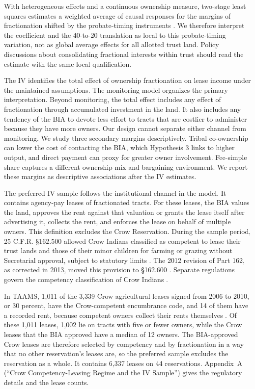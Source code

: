 \documentclass[12pt]{article}
\begin{document}
With heterogeneous effects and a continuous ownership measure, two-stage least squares estimates a weighted average of causal responses for the margins of fractionation shifted by the probate-timing instruments \citep{MogstadTorgovitsky2018}. We therefore interpret the coefficient and the 40-to-20 translation as local to this probate-timing variation, not as global average effects for all allotted trust land. Policy discussions about consolidating fractional interests within trust should read the estimate with the same local qualification.

The IV identifies the total effect of ownership fractionation on lease income under the maintained assumptions. The monitoring model organizes the primary interpretation. Beyond monitoring, the total effect includes any effect of fractionation through accumulated investment in the land. It also includes any tendency of the BIA to devote less effort to tracts that are costlier to administer because they have more owners. Our design cannot separate either channel from monitoring. We study three secondary margins descriptively. Tribal co-ownership can lower the cost of contacting the BIA, which Hypothesis 3 links to higher output, and direct payment can proxy for greater owner involvement. Fee-simple share captures a different ownership mix and bargaining environment. We report these margins as descriptive associations after the IV estimates.

The preferred IV sample follows the institutional channel in the model. It contains agency-pay leases of fractionated tracts. For these leases, the BIA values the land, approves the rent against that valuation or grants the lease itself after advertising it, collects the rent, and enforces the lease on behalf of multiple owners. This definition excludes the Crow Reservation. During the sample period, 25 C.F.R. \S 162.500 allowed Crow Indians classified as competent to lease their trust lands and those of their minor children for farming or grazing without Secretarial approval, subject to statutory limits \citep{CFR2008Part162}. The 2012 revision of Part 162, as corrected in 2013, moved this provision to \S 162.600 \citep{BIA2012,ECFR25CFR162600}. Separate regulations govern the competency classification of Crow Indians \citep{ECFR25CFR153}.

In TAAMS, 1,011 of the 3,339 Crow agricultural leases signed from 2006 to 2010, or 30 percent, have the Crow-competent encumbrance code, and 14 of them have a recorded rent, because competent owners collect their rents themselves \citep{CFR2008Part162}. Of these 1,011 leases, 1,002 lie on tracts with five or fewer owners, while the Crow leases that the BIA approved have a median of 12 owners. The BIA-approved Crow leases are therefore selected by competency and by fractionation in a way that no other reservation's leases are, so the preferred sample excludes the reservation as a whole. It contains 6,337 leases on 44 reservations. Appendix~A (``Crow Competency-Leasing Regime and the IV Sample'') gives the regulatory details and the lease counts.
\end{document}
